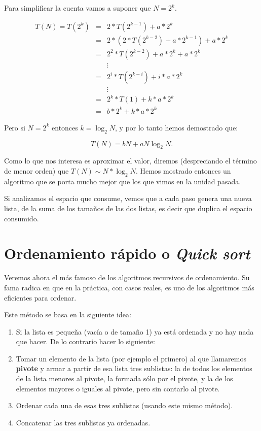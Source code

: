Para simplificar la cuenta vamos a suponer que $N = 2^k$.

\begin{eqnarray}
T(N) = T(2^k) &=& 2 * T(2^{k-1}) + a * 2^k \\
              &=& 2 * \left( 2*T(2^{k-2} ) + a * 2^{k-1} \right) + a * 2^k\\
&=& 2^2*T(2^{k-2} ) + a*2^k + a*2^k\\
&&\vdots\\
&=& 2^i* T(2^{k-i})+ i * a * 2^k\\
&&\vdots\\
&=& 2^k*T(1) + k * a * 2^k\\
&=& b * 2^k  + k * a * 2^k
\end{eqnarray}

Pero si $N = 2^k$ entonces $k=\log_2N$, y por lo tanto hemos demostrado
que:

\begin{equation}
T(N) = b N + a N \log_2N.
\end{equation}

Como lo que nos interesa es aproximar el valor, diremos (despreciando el
término de menor orden) que $T(N) \sim N*\log_2N$. Hemos mostrado entonces
un algoritmo que se porta mucho mejor que los que vimos en la unidad
pasada.

Si analizamos el espacio que consume, vemos que a cada paso genera una
nueva lista, de la suma de los tamaños de las dos listas, es decir que
duplica el espacio consumido.

\section{Ordenamiento rápido o {\it Quick sort}}

Veremos ahora el más famoso de los algoritmos recursivos de ordenamiento.
Su fama radica en que en la práctica, con casos reales, es uno de los
algoritmos más eficientes para ordenar.

Este método se basa en la siguiente idea:

\begin{enumerate}
\item Si la lista es pequeña (vacía o de tamaño 1) ya está ordenada y
no hay nada que hacer. De lo contrario hacer lo siguiente:

\item Tomar un elemento de la lista (por ejemplo el primero) al que
llamaremos {\bf pivote} y armar a partir de esa lista tres sublistas: la de
todos los elementos de la lista menores al pivote, la formada sólo por el
pivote, y la de los elementos mayores o iguales al pivote, pero sin
contarlo al pivote.

\item Ordenar cada una de esas tres sublistas (usando este mismo método).

\item Concatenar las tres sublistas ya ordenadas.
\end{enumerate}

